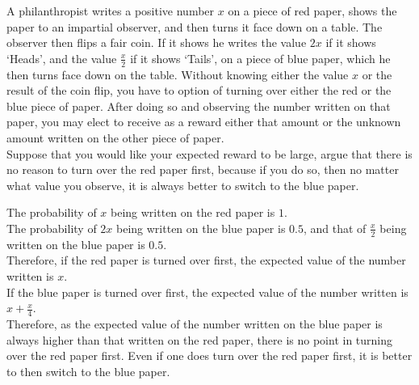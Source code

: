\documentclass[fleqn, a4paper, 11pt, oneside]{amsart}
\theoremstyle{definition}
\theoremstyle{theorem}
\begin{document}
\begin{question}
	A philanthropist writes a positive number $x$ on a piece of red paper, shows the paper to an impartial observer, and then turns it face down on a table.
	The observer then flips a fair coin.
	If it shows he writes the value $2 x$ if it shows `Heads', and the value $\frac{x}{2}$ if it shows `Tails', on a piece of blue paper, which he then turns face down on the table.
	Without knowing either the value $x$ or the result of the coin flip, you have to option of turning over either the red or the blue piece of paper.
	After doing so and observing the number written on that paper, you may elect to receive as a reward either that amount or the unknown amount written on the other piece of paper.\\
	Suppose that you would like your expected reward to be large, argue that there is no reason to turn over the red paper first, because if you do so, then no matter what value you observe, it is always better to switch to the blue paper.
\end{question}

\begin{solution}
	The probability of $x$ being written on the red paper is $1$.\\
	The probability of $2 x$ being written on the blue paper is $0.5$, and that of $\frac{x}{2}$ being written on the blue paper is $0.5$.\\
	Therefore, if the red paper is turned over first, the expected value of the number written is $x$.\\
	If the blue paper is turned over first, the expected value of the number written is $x + \frac{x}{4}$.\\
	Therefore, as the expected value of the number written on the blue paper is always higher than that written on the red paper, there is no point in turning over the red paper first.
	Even if one does turn over the red paper first, it is better to then switch to the blue paper.
\end{solution}
\end{document}
